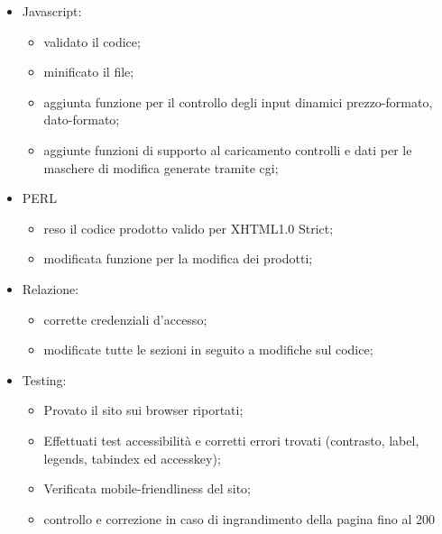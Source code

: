 {\begin{itemize}
\begin{itemize}
			\item creazione del foglio di stile dedicato al browser Internet Explorer.
		\end{itemize}
		\item Javascript:
		\begin{itemize}\itemsep1pt
			\item validato il codice;
			\item minificato il file;
			\item aggiunta funzione per il controllo degli input dinamici prezzo-formato, dato-formato;
			\item aggiunte funzioni di supporto al caricamento controlli e dati per le maschere di modifica generate tramite cgi;
		\end{itemize}
		\item PERL
		\begin{itemize}\itemsep1pt
			\item reso il codice prodotto valido per XHTML1.0 Strict;
			\item modificata funzione per la modifica dei prodotti;
		\end{itemize}
		\item Relazione: 
		\begin{itemize}\itemsep1pt
			\item corrette credenziali d'accesso;
			\item modificate tutte le sezioni in seguito a modifiche sul codice;
		\end{itemize}
		\item Testing:
		\begin{itemize}\itemsep1pt
			\item Provato il sito sui browser riportati;
			\item Effettuati test accessibilità e corretti errori trovati (contrasto, label, legends, tabindex ed accesskey);
			\item Verificata mobile-friendliness del sito;
			\item controllo e correzione in caso di ingrandimento della pagina fino al 200%
		\end{itemize}
	\end{itemize}
}